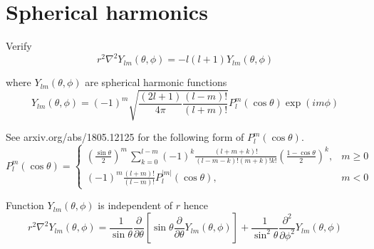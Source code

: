 

\section*{Spherical harmonics}

Verify
\begin{equation*}
r^2\nabla^2Y_{lm}(\theta,\phi)=-l(l+1)Y_{lm}(\theta,\phi)
\end{equation*}

where $Y_{lm}(\theta,\phi)$ are spherical harmonic functions
\begin{equation*}
Y_{lm}(\theta,\phi)=(-1)^m\sqrt{\frac{(2l+1)}{4\pi}\frac{(l-m)!}{(l+m)!}}
P_l^m(\cos\theta)\exp(im\phi)
\end{equation*}

See arxiv.org/abs/1805.12125 for the following form of $P_l^m(\cos\theta)$.
\begin{equation*}
P_l^m(\cos\theta)=\begin{cases}\displaystyle
\left(\frac{\sin\theta}{2}\right)^m\,\sum_{k=0}^{l-m}
(-1)^k\frac{(l+m+k)!}{(l-m-k)!(m+k)!k!}
\left(\frac{1-\cos\theta}{2}\right)^k, & m\ge0
\\[4ex]
\displaystyle(-1)^m\frac{(l+m)!}{(l-m)!}P_l^{|m|}(\cos\theta), & m<0
\end{cases}
\end{equation*}

Function $Y_{lm}(\theta,\phi)$ is independent of $r$ hence
\begin{equation*}
r^2\nabla^2Y_{lm}(\theta,\phi)=\frac{1}{\sin\theta}\frac{\partial}{\partial\theta}
\left[\sin\theta\frac{\partial}{\partial\theta}Y_{lm}(\theta,\phi)\right]
+\frac{1}{\sin^2\theta}\frac{\partial^2}{\partial\phi^2}Y_{lm}(\theta,\phi)
\end{equation*}


